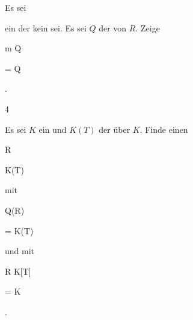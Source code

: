 {} {}



{}

{


Es sei

 ein
der kein
sei. Es sei $Q$ der
von $R$. Zeige


\mavergleichskette

{\vergleichskette

{ {\mathfrak m} Q
}

{ = }{ Q
}

{  }{
}

{    }{
}

{   }{
}

}
{}{}{.}


}

{} {}





{4}

{


Es sei $K$ ein
und $K(T)$ der
über $K$. Finde einen


\mavergleichskette

{\vergleichskette

{ R
}

{ \subseteq }{ K(T)
}

{  }{
}

{    }{
}

{   }{
}

}
{}{}{}
mit


\mavergleichskette

{\vergleichskette

{ Q(R)
}

{ = }{ K(T)
}

{  }{
}

{    }{
}

{   }{
}

}
{}{}{}
und mit


\mavergleichskette

{\vergleichskette

{ R \cap K[T]
}

{ = }{ K
}

{  }{
}

{    }{
}

{   }{
}

}
{}{}{.}


}

